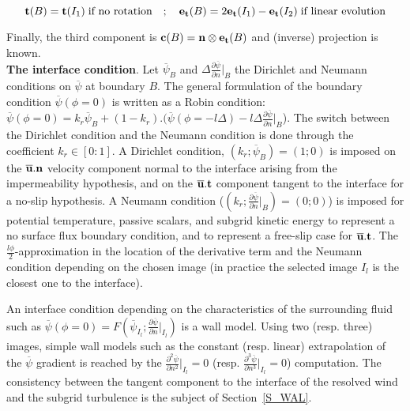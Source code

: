 \vspace{-0.25cm}
\begin{equation}
	{\bf t}(B) = {\bf t}(I_1)  \hspace{0.1cm} \textnormal{if no rotation} \hspace{0.35cm} ; \hspace{0.35cm} {\bf e_t}(B)  =2{\bf e_t}(I_1)-{\bf e_t}(I_2)  \hspace{0.1cm} \textnormal{if linear evolution} 
\end{equation}
\vspace{-0.25cm}

Finally, the third component is ${\bf c}(B) = {\bf n}\otimes{\bf e_t}(B)$ and (inverse) projection is known.\\	

{\bf The interface condition}. Let $\overline{\psi}_B$ and $\Delta\frac{\partial \overline{\psi}}{\partial n}{\big|}_B$ the Dirichlet and Neumann conditions on $\overline{\psi}$ at boundary $B$. The general formulation of the boundary condition $\overline{\psi}(\phi=0)$ is written as a Robin condition: $\overline{\psi}(\phi=0)=k_{r}\overline{\psi}_B+(1-k_{r}).(\overline{\psi}(\phi=-l\Delta)-l\Delta\frac{\partial \overline{\psi}}{\partial n}{\big|}_B$). The switch between the Dirichlet condition and the Neumann condition is done through the coefficient $k_{r} \in [0:1]$. A Dirichlet condition, $(k_{r};\overline{\psi}_B)=(1;0)$ is imposed on the $\overline{\bf{u}}.{\bf n}$ velocity component normal to the interface arising from the impermeability hypothesis, and on the $\overline{\bf{u}}.{\bf t}$ component tangent to the interface for a no-slip hypothesis. A Neumann condition ($(k_{r};\frac{\partial \overline{\psi}}{\partial n}{\big|}_B)=(0;0)$) is imposed for potential temperature, passive scalars, and subgrid kinetic energy to represent a no surface flux boundary condition, and to represent a free-slip case for $\overline{\bf{u}}.{\bf t}$. The $\frac{l\phi}{2}$-approximation in the location of the derivative term and the Neumann condition depending on the chosen image (in practice the selected image $I_l$ is the closest one to the interface).

An interface condition depending on the characteristics of the surrounding fluid such as $\overline{\psi}(\phi=0)=F(\overline{\psi}_{I_l};\frac{\partial \overline{\psi}}{\partial n}{\big|}_{I_l})$ is a wall model. Using two (resp. three) images, simple wall models such as the constant (resp. linear) extrapolation of the $\overline{\psi}$ gradient is reached by the $\frac{\partial^2 \overline{\psi}}{\partial n^2}{\big|}_{I_l}=0$ (resp. $\frac{\partial^3 \overline{\psi}}{\partial n^3}{\big|}_{I_l}=0$) computation. The consistency between the tangent component to the interface of the resolved wind and the subgrid turbulence is the subject of Section~\ref{S_WAL}.\\

